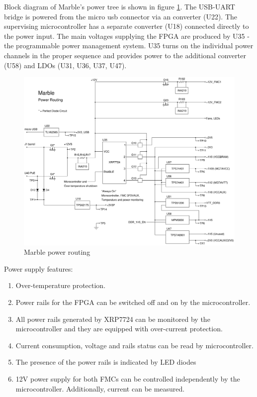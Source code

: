 \documentclass[12pt,oneside,a4]{article}
\begin{document}
Block diagram of Marble's power tree is shown in figure \ref{pwr}. The USB-UART bridge is powered from the micro usb connector via an converter (U22). The supervising microcontroller has a separate converter (U18) connected directly to the power input. The main voltages supplying the FPGA are produced by U35 - the programmable power management system. U35 turns on the individual power channels in the proper sequence and provides power to the additional converter (U58) and LDOs (U31, U36, U37, U47). 

\begin{figure}[H]
\begin{center}
\includegraphics[width=1.1\linewidth]{m_power.png}
 \caption{Marble power routing}\label{pwr}
\end{center}
\end{figure}

Power supply features:
\begin{enumerate}
	\item Over-temperature protection.
	\item Power rails for the FPGA can be switched off and on by the microcontroller.
	\item All power rails generated by XRP7724 can be monitored by the microcontroller and they are equipped with over-current protection.
	\item Current consumption, voltage and rails status can be read by microcontroller. 
	\item The presence of the power rails is indicated by LED diodes
	\item 12V power supply for both FMCs can be controlled independently by the microcontroller. Additionally,  current can be measured.
\end{enumerate}
\end{document}
